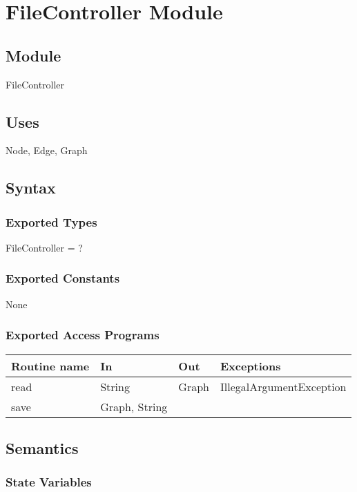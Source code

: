 \documentclass[12pt]{article}
\begin{document}
\newpage

\section{FileController Module}

\subsection*{Module}

FileController

\subsection*{Uses}

Node, Edge, Graph

\subsection*{Syntax}

\subsubsection*{Exported Types}

FileController = ?

\subsubsection*{Exported Constants}

None

\subsubsection*{Exported Access Programs}

\begin{tabular}{| l | l | l | l |}
	\hline
	\textbf{Routine name} & \textbf{In} & \textbf{Out} & \textbf{Exceptions}\\
	\hline
	read & String & Graph & IllegalArgumentException\\
	\hline
	save & Graph, String & ~ & ~\\
	\hline
\end{tabular}

\subsection*{Semantics}

\subsubsection*{State Variables}
\end{document}
